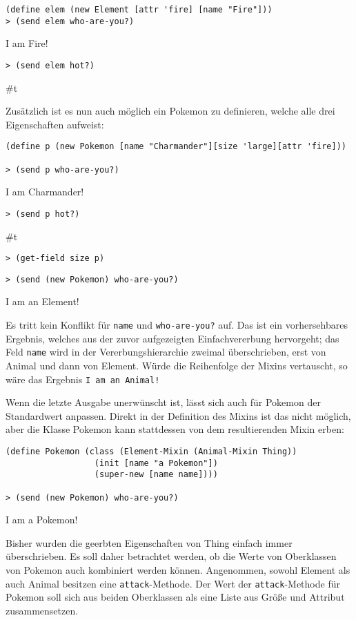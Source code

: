 \begin{lstlisting}
(define elem (new Element [attr 'fire] [name "Fire"]))
> (send elem who-are-you?)
\end{lstlisting} 
{\routput {\qq}I am Fire!\qq}

\begin{lstlisting}
> (send elem hot?)
\end{lstlisting} 
{\routput \#t}

Zusätzlich ist es nun auch möglich ein Pokemon zu definieren, welche alle drei Eigenschaften aufweist:
\begin{lstlisting}
(define p (new Pokemon [name "Charmander"][size 'large][attr 'fire]))
 
> (send p who-are-you?)
\end{lstlisting}
{\routput {\qq}I am Charmander!\qq}
\begin{lstlisting}
> (send p hot?)
\end{lstlisting}
{\routput \#t}
\begin{lstlisting}
> (get-field size p)
\end{lstlisting}
{}
\begin{lstlisting}
> (send (new Pokemon) who-are-you?)
\end{lstlisting}
{\routput {\qq}I am an Element!\qq}

Es tritt kein Konflikt für \texttt{name} und \texttt{who-are-you?} auf. Das ist ein vorhersehbares Ergebnis, welches aus der zuvor aufgezeigten Einfachvererbung hervorgeht; das Feld \texttt{name} wird in der Vererbungshierarchie zweimal überschrieben, erst von Animal und dann von Element. Würde die Reihenfolge der Mixins vertauscht, so wäre das Ergebnis \texttt{{\qq}I am an Animal!\qq}

Wenn die letzte Ausgabe unerwünscht ist, lässt sich auch für Pokemon der Standardwert anpassen. Direkt in der Definition des Mixins ist das nicht möglich, aber die Klasse Pokemon kann stattdessen von dem resultierenden Mixin erben:

\begin{lstlisting}
(define Pokemon (class (Element-Mixin (Animal-Mixin Thing))
                  (init [name "a Pokemon"])
                  (super-new [name name])))
     
> (send (new Pokemon) who-are-you?)
\end{lstlisting}
{\routput {\qq}I am a Pokemon!\qq}

Bisher wurden die geerbten Eigenschaften von Thing einfach immer überschrieben. Es soll daher betrachtet werden, ob die Werte von Oberklassen von Pokemon auch kombiniert werden können. Angenommen, sowohl Element als auch Animal besitzen eine \texttt{attack}-Methode. Der Wert der \texttt{attack}-Methode für Pokemon soll sich aus beiden Oberklassen als eine Liste aus Größe und Attribut zusammensetzen.


